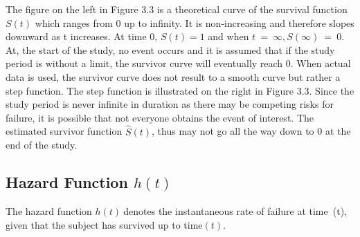 \documentclass[12pt]{report}
\begin{document}
The figure on the left in Figure 3.3 is a theoretical curve of the survival function\ \(S\left(t\right) \) which ranges from 0 up to infinity. It is non-increasing and therefore slopes downward as t increases. At time 0, \(S\left(t\right)=1\) and when \( t\ =\ \infty , S\left(\infty\right)\ =\ 0.\) At, the start of the study, no event occurs and it is assumed that if the study period is without a limit, the survivor curve will eventually reach 0.
When actual data is used, the survivor curve does not result to a smooth curve but rather a step function. The step function is illustrated on the right in Figure 3.3. Since the study period is never infinite in duration as there may be competing risks for failure, it is possible that not everyone obtains the event of interest. The estimated survivor function \(\hat{S}\left(t\right)\), thus may not go all the way down to 0 at the end of the study.

\subsection{Hazard Function \( h(t)\)}

The hazard function \( h(t)\ \)denotes the instantaneous rate of failure at time\ (t), given that the subject has survived up to time\( (t).\)
\end{document}
